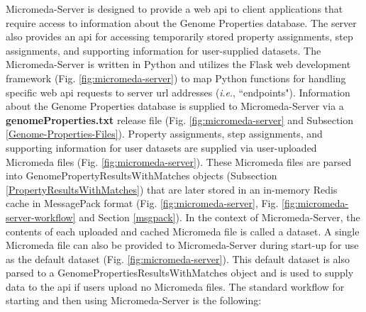 Micromeda-Server is designed to provide a web \gls{api} to client applications 
that require access to information about the Genome Properties database. The 
server also provides an \gls{api} for accessing temporarily stored property 
assignments, step assignments, and supporting information for user-supplied 
datasets. The Micromeda-Server is written in Python and utilizes the Flask web 
development framework \cite{grinberg2018flask} (Fig. \ref{fig:micromeda-server}) 
to map Python functions for handling specific web \gls{api} requests to server 
\gls{url} addresses (\textit{i}.\textit{e}., ``endpoints"). Information about 
the Genome Properties database is supplied to Micromeda-Server via a 
\textbf{genomeProperties.txt} release file (Fig. \ref{fig:micromeda-server} and 
Subsection \ref{Genome-Properties-Files}). Property assignments, step 
assignments, and supporting information for user datasets are supplied via 
user-uploaded Micromeda files (Fig. \ref{fig:micromeda-server}). These Micromeda 
files are parsed into GenomePropertyResultsWithMatches objects (Subsection 
\ref{PropertyResultsWithMatches}) that are later stored in an in-memory Redis 
cache \cite{han2011survey} in MessagePack format \cite{furuhashi2013messagepack} 
(Fig. \ref{fig:micromeda-server}, Fig. \ref{fig:micromeda-server-workflow} and 
Section \ref{msgpack}). In the context of Micromeda-Server, the contents of each 
uploaded and cached Micromeda file is called a dataset. A single Micromeda file 
can also be provided to Micromeda-Server during start-up for use as the default 
dataset (Fig. \ref{fig:micromeda-server}). This default dataset is also parsed 
to a GenomePropertiesResultsWithMatches object and is used to supply data to the 
\gls{api} if users upload no Micromeda files. The standard workflow for starting 
and then using Micromeda-Server is the following:


